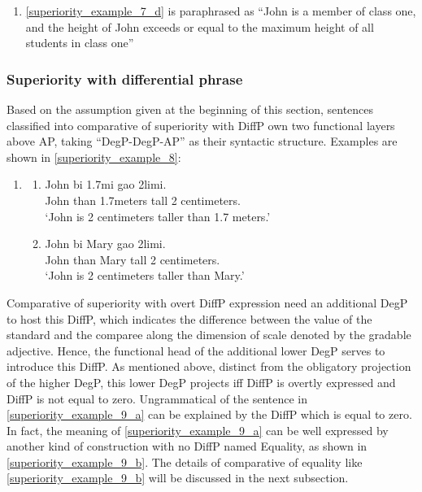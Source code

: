 \documentclass{ctexart}
\begin{document}
\begin{enumerate}
\begin{enumerate}
        \item \label{superiority_example_7_e}
        \ref{superiority_example_7_d} is paraphrased as ``John is a member of class one, and the height of John exceeds or equal to the  maximum height of all students in class one''

    \end{enumerate}
\end{enumerate}

\subsubsection{Superiority with differential phrase}

\noindent
Based on the assumption given at the beginning of this section, sentences classified into comparative of superiority with DiffP own two functional layers above AP, taking ``DegP-DegP-AP'' as their syntactic structure. Examples are shown in \ref{superiority_example_8}:

\begin{enumerate}
    \item \label{superiority_example_8}
    \begin{enumerate}
        \item \label{superiority_example_8_a}
        John bi \enspace \enspace 1.7mi \enspace \enspace \enspace \enspace gao \enspace \enspace \enspace 2limi. \\
        John than 1.7meters tall 2 centimeters. \\
        `John is 2 centimeters taller than 1.7 meters.'

        \item \label{superiority_example_8_b}
        John bi \enspace Mary \enspace gao \enspace \enspace \enspace 2limi. \\
        John than Mary tall 2 centimeters.  \\
        `John is 2 centimeters taller than Mary.'

    \end{enumerate}
\end{enumerate}

Comparative of superiority with overt DiffP expression need an additional DegP to host this DiffP, which indicates the difference between the value of the standard and the comparee along the dimension of scale denoted by the gradable adjective. Hence, the functional head of the additional lower DegP serves to introduce this DiffP. As mentioned above, distinct from the obligatory projection of the higher DegP, this lower DegP projects iff DiffP is overtly expressed and DiffP is not equal to zero. Ungrammatical of the sentence in \ref{superiority_example_9_a} can be explained by the DiffP which is equal to zero. In fact, the meaning of \ref{superiority_example_9_a} can be well expressed by another kind of construction with no DiffP named Equality, as shown in \ref{superiority_example_9_b}. The details of comparative of equality like \ref{superiority_example_9_b} will be discussed in the next subsection.
\end{document}
